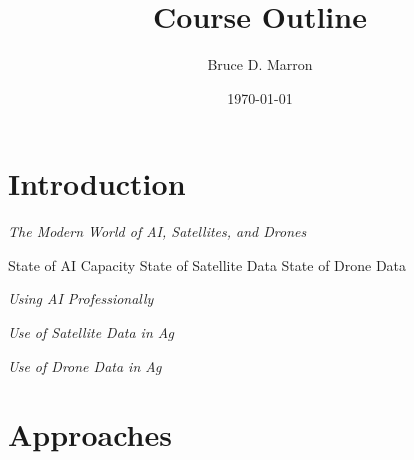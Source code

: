 \documentclass[12pt, letterpaper]{article}
\title{\vspace{-15mm}\fontsize{14pt}{10pt}
                    \selectfont \textbf{Course Outline}   %
                    \vspace{-7mm}
      }
\author{
     \normalsize Bruce D. Marron \\                     %
     \vspace{-5mm}
}
\date{\normalsize \today}
\begin{document}
\begin{singlespacing}
\maketitle                                      %
\end{singlespacing}
\thispagestyle{fancy}                           %


\section{Introduction}

\large
\begin{flushleft}
\textit{The Modern World of AI, Satellites, and Drones}
\end{flushleft}

\normalsize
\begin{outline}[enumerate]
\1 State of AI Capacity
\1 State of Satellite Data
\1 State of Drone Data
\end{outline}


\large
\begin{flushleft}
\textit{Using AI Professionally}
\end{flushleft}

\normalsize
\begin{outline}[enumerate]
\1 
\end{outline}


\large
\begin{flushleft}
\textit{Use of Satellite Data in Ag}
\end{flushleft}

\normalsize
\begin{outline}[enumerate]
\1 
\end{outline}


\large
\begin{flushleft}
\textit{Use of Drone Data in Ag}
\end{flushleft}

\normalsize
\begin{outline}[enumerate]
\1 
\end{outline}



\section{Approaches}
\end{document}
